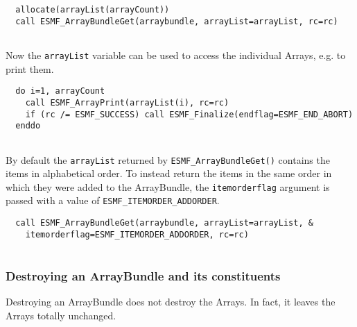  \begin{verbatim}
  allocate(arrayList(arrayCount))
  call ESMF_ArrayBundleGet(arraybundle, arrayList=arrayList, rc=rc)
 
\end{verbatim}
 

   Now the {\tt arrayList} variable can be used to access the individual Arrays,
   e.g. to print them. 

 \begin{verbatim}
  do i=1, arrayCount
    call ESMF_ArrayPrint(arrayList(i), rc=rc)
    if (rc /= ESMF_SUCCESS) call ESMF_Finalize(endflag=ESMF_END_ABORT)
  enddo
 
\end{verbatim}
 

   \begin{sloppypar}
   By default the {\tt arrayList} returned by {\tt ESMF\_ArrayBundleGet()}
   contains the items in alphabetical order. To instead return the items in the
   same order in which they were added to the ArrayBundle, the
   {\tt itemorderflag} argument is passed with a value of 
   {\tt ESMF\_ITEMORDER\_ADDORDER}.
   
   \end{sloppypar} 

 \begin{verbatim}
  call ESMF_ArrayBundleGet(arraybundle, arrayList=arrayList, &
    itemorderflag=ESMF_ITEMORDER_ADDORDER, rc=rc)
 
\end{verbatim}
 

   \subsubsection{Destroying an ArrayBundle and its constituents}
   

   Destroying an ArrayBundle does not destroy the Arrays. In fact, it leaves the
   Arrays totally unchanged. 

